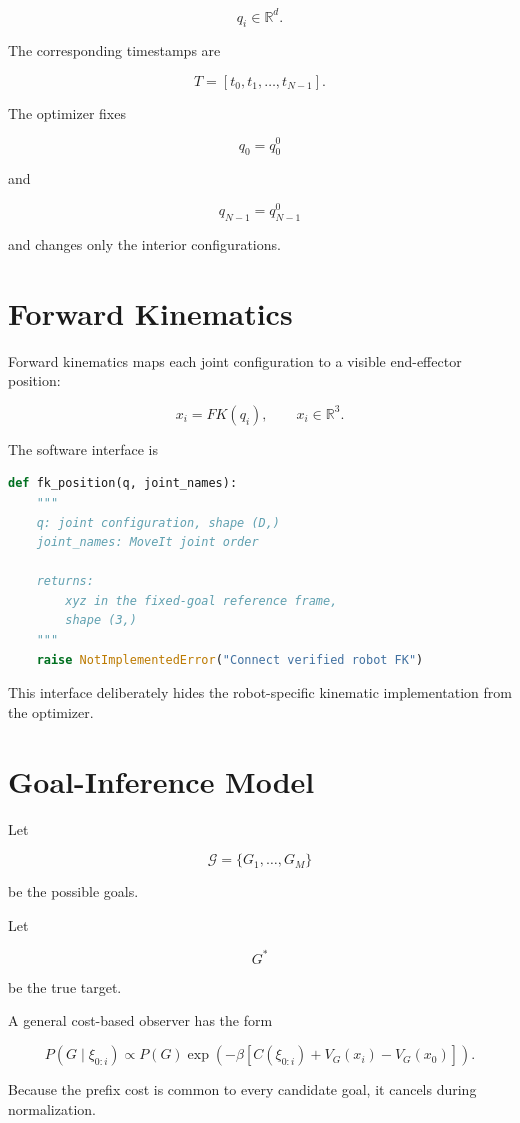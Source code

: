 \documentclass[11pt]{article}
\begin{document}
\[
q_i \in \mathbb{R}^{d}.
\]

The corresponding timestamps are

\[
T =
[t_0,t_1,\ldots,t_{N-1}].
\]

The optimizer fixes

\[
q_0 = q_0^0
\]

and

\[
q_{N-1} = q_{N-1}^0
\]

and changes only the interior configurations.

\section{Forward Kinematics}

Forward kinematics maps each joint configuration to a visible
end-effector position:

\[
x_i = FK(q_i),
\qquad
x_i \in \mathbb{R}^{3}.
\]

The software interface is

\begin{lstlisting}[language=Python]
def fk_position(q, joint_names):
    """
    q: joint configuration, shape (D,)
    joint_names: MoveIt joint order

    returns:
        xyz in the fixed-goal reference frame,
        shape (3,)
    """
    raise NotImplementedError("Connect verified robot FK")
\end{lstlisting}

This interface deliberately hides the robot-specific
kinematic implementation from the optimizer.

\section{Goal-Inference Model}

Let

\[
\mathcal G =
\{G_1,\ldots,G_M\}
\]

be the possible goals.

Let

\[
G^*
\]

be the true target.

A general cost-based observer has the form

\[
P(G\mid\xi_{0:i})
\propto
P(G)
\exp
\left(
-\beta[
C(\xi_{0:i})
+
V_G(x_i)
-
V_G(x_0)
]
\right).
\]

Because the prefix cost is common to every candidate goal, it
cancels during normalization.
\end{document}
